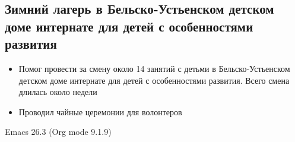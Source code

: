 \documentclass[11pt]{article}
\begin{document}
\subsection{Зимний лагерь в Бельско-Устьенском детском доме интернате для детей с особенностями развития}
\label{sec:org2b44869}
\begin{itemize}
\item Помог провести за смену около 14 занятий с детьми в Бельско-Устьенском детском доме интернате для детей с особенностями развития. Всего смена длилась около недели
\item Проводил чайные церемонии для волонтеров
\end{itemize}
Emacs 26.3 (Org mode 9.1.9)
\end{document}
